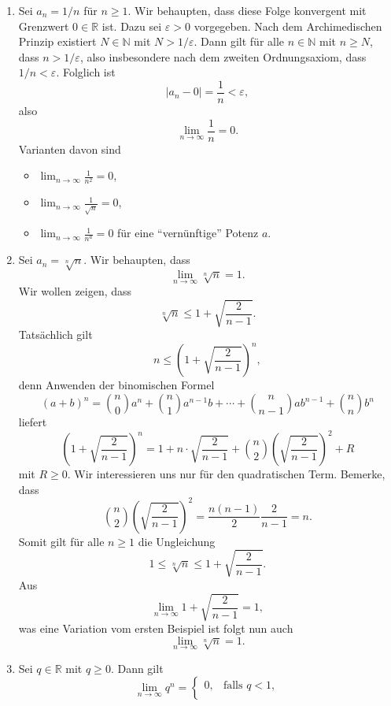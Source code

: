 \documentclass[../main.tex]{subfiles}
\begin{document}
\begin{examples}
  \leavevmode
\begin{enumerate}[(1)]
  \item Sei $a_n = 1/n$ für $n \geq 1$. Wir behaupten,
	  dass diese Folge konvergent mit Grenzwert
	  $0 \in \mathbb{R}$ ist. Dazu sei $\varepsilon > 0$
	  vorgegeben.
	  Nach dem Archimedischen Prinzip
	  existiert $N \in \mathbb{N}$ mit
	  $N > 1/\varepsilon$.
	  Dann gilt für alle $n \in \mathbb{N}$ mit $n \geq N$,
	  dass $n > 1/\varepsilon$, also insbesondere
	  nach dem zweiten Ordnungsaxiom, dass
	  $1/n < \varepsilon$.
	  Folglich ist
	  \[
		  |a_n - 0| = \frac{1}{n} < \varepsilon,
	  \]
	  also
	  \[
		  \lim_{n \to \infty}\frac{1}{n} = 0.
	  \]
	  Varianten davon sind
	  \begin{itemize}
	    \item $\lim_{n \to \infty} \frac{1}{n^2} = 0$,
	    \item $\lim_{n \to \infty} \frac{1}{\sqrt n} = 0$,
	    \item $\lim_{n \to \infty} \frac{1}{n^a} = 0$ für
		    eine ``vernünftige'' Potenz $a$.
	  \end{itemize}
  \item Sei $a_n = \sqrt[n]{n}$. Wir behaupten, dass
	  \[
		  \lim_{n \to \infty} \sqrt[n]{n} = 1.
	  \]
	  Wir wollen zeigen, dass 
	  \[
		  \sqrt[n]{n} \leq 1 + \sqrt{\frac{2}{n-1}}.
	  \]
	  Tatsächlich gilt
	  \[
		  n  \leq {\left( 1 + \sqrt{\frac{2}{n-1}} \right)}^n,
	  \]
	  denn Anwenden der binomischen Formel
	  \[
		  {(a + b)}^n = \binom{n}{0}a^n + \binom{n}{1}a^{n-1}b
		  + \cdots + \binom{n}{n-1}ab^{n-1} + \binom{n}{n}b^n
	  \]
	  liefert
	  \[
		  {\left( 1 + \sqrt{\frac{2}{n-1}} \right)}^n
		  = 1 + n \cdot \sqrt{\frac{2}{n-1}}
		  + \binom{n}{2} {\left( \sqrt{\frac{2}{n-1}} \right)}^2
		  + R
	  \]
	  mit $R \geq 0$.
    Wir interessieren uns nur für den 
    quadratischen Term.
    Bemerke, dass
    \[
      \binom{n}{2}{\left( \sqrt{\frac{2}{n-1}} \right)}^2
      = \frac{n(n-1)}{2} \frac{2}{n-1} = n.
    \]
	  Somit gilt für alle $n \geq 1$ die Ungleichung
	  \[
		  1 \leq \sqrt[n]{n} \leq 1 + \sqrt{\frac{2}{n-1}}.
	  \]
	  Aus
	  \[
		  \lim_{n \to \infty} 1 + \sqrt{\frac{2}{n-1}} = 1,
	  \]
    was eine Variation vom ersten Beispiel ist folgt nun auch
	  \[
		  \lim_{n \to \infty} \sqrt[n]{n} = 1.
	  \]
  \item Sei $q \in \mathbb{R}$ mit $q \geq 0$. Dann gilt
	  \[
	    \lim_{n \to \infty} q^n = 
	    \begin{cases}
		    0, & \text{falls } q < 1, \\

\end{cases}\]
\end{enumerate}
\end{examples}
\end{document}

